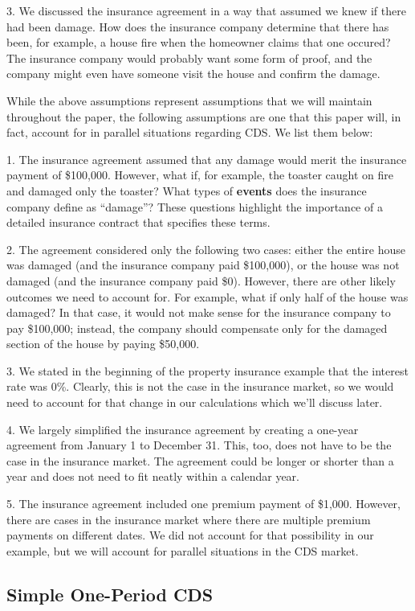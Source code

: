 \documentclass{jss}
\begin{document}
3. We discussed the insurance agreement in a way that assumed we knew if there had been damage. How does the insurance company determine that there has been, for example, a house fire when the homeowner claims that one occured? The insurance company would probably want some form of proof, and the company might even have someone visit the house and confirm the damage. 

While the above assumptions represent assumptions that we will maintain throughout the paper, the following assumptions are one that this paper will, in fact, account for in parallel situations regarding CDS. We list them below:

1. The insurance agreement assumed that any damage would merit the insurance payment of \$100,000. However, what if, for example, the toaster caught on fire and damaged only the toaster? What types of \textbf{events} does the insurance company define as ``damage''? These questions highlight the importance of a detailed insurance contract that specifies these terms.

2. The agreement considered only the following two cases: either the entire house was damaged (and the insurance company paid \$100,000), or the house was not damaged (and the insurance company paid \$0). However, there are other likely outcomes we need to account for. For example, what if only half of the house was damaged? In that case, it would not make sense for the insurance company to pay \$100,000; instead, the company should compensate only for the damaged section of the house by paying \$50,000. 

3. We stated in the beginning of the property insurance example that the interest rate was 0\%. Clearly, this is not the case in the insurance market, so we would need to account for that change in our calculations which we'll discuss later.

4. We largely simplified the insurance agreement by creating a one-year agreement from January 1 to December 31. This, too, does not have to be the case in the insurance market. The agreement could be longer or shorter than a year and does not need to fit neatly within a calendar year.

5. The insurance agreement included one premium payment of \$1,000. However, there are cases in the insurance market where there are multiple premium payments on different dates. We did not account for that possibility in our example, but we will account for parallel situations in the CDS market.

\subsection{Simple One-Period CDS}
\label{sec:OnePeriod}
\end{document}
